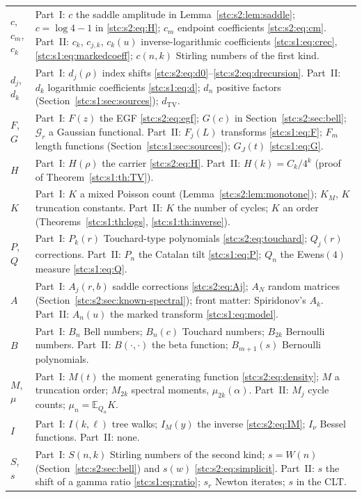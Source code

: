 \documentclass[11pt,letterpaper]{article}
\numberwithin{equation}{section}
\theoremstyle{remark}\newtheorem{remark}[theorem]{Remark}
\newcommand{\E}{\mathbb E}
\begin{document}
\begin{longtable}{@{}>{\raggedright\arraybackslash}p{} >{\raggedright\arraybackslash}p{}@{}}
$c$, $c_m$, $c_k$ & Part~I: $c$ the saddle amplitude in Lemma~\ref{stc:s2:lem:saddle}; $c=\log4-1$ in \eqref{stc:s2:eq:H}; $c_m$ endpoint coefficients \eqref{stc:s2:eq:cm}. Part~II: $c_k$, $c_{j,k}$, $c_k(u)$ inverse-logarithmic coefficients \eqref{stc:s1:eq:crec}, \eqref{stc:s1:eq:markedcoeff}; $c(n,k)$ Stirling numbers of the first kind.\\
$d_j$, $d_k$ & Part~I: $d_j(\rho)$ index shifts \eqref{stc:s2:eq:d0}--\eqref{stc:s2:eq:drecursion}. Part~II: $d_k$ logarithmic coefficients \eqref{stc:s1:eq:d}; $d_n$ positive factors (Section~\ref{stc:s1:sec:sources}); $d_{\mathrm{TV}}$.\\
$F$, $G$ & Part~I: $F(z)$ the EGF \eqref{stc:s2:eq:egf}; $G(c)$ in Section~\ref{stc:s2:sec:bell}; $\mathcal G_r$ a Gaussian functional. Part~II: $F_j(L)$ transforms \eqref{stc:s1:eq:F}; $F_m$ length functions (Section~\ref{stc:s1:sec:sources}); $G_J(t)$ \eqref{stc:s1:eq:G}.\\
$H$ & Part~I: $H(\rho)$ the carrier \eqref{stc:s2:eq:H}. Part~II: $H(k)=C_k/4^k$ (proof of Theorem~\ref{stc:s1:th:TV}).\\
$K$ & Part~I: $K$ a mixed Poisson count (Lemma~\ref{stc:s2:lem:monotone}); $K_M$, $K$ truncation constants. Part~II: $K$ the number of cycles; $K$ an order (Theorems~\ref{stc:s1:th:logs}, \ref{stc:s1:th:inverse}).\\
$P$, $Q$ & Part~I: $P_k(r)$ Touchard-type polynomials \eqref{stc:s2:eq:touchard}; $Q_j(r)$ corrections. Part~II: $P_n$ the Catalan tilt \eqref{stc:s1:eq:P}; $Q_n$ the Ewens$(4)$ measure \eqref{stc:s1:eq:Q}.\\
$A$ & Part~I: $A_j(r,b)$ saddle corrections \eqref{stc:s2:eq:Aj}; $A_N$ random matrices (Section~\ref{stc:s2:sec:known-spectral}); front matter: Spiridonov's $A_k$. Part~II: $A_n(u)$ the marked transform \eqref{stc:s1:eq:model}.\\
$B$ & Part~I: $B_n$ Bell numbers; $B_n(c)$ Touchard numbers; $B_{2k}$ Bernoulli numbers. Part~II: $B(\cdot,\cdot)$ the beta function; $B_{m+1}(s)$ Bernoulli polynomials.\\
$M$, $\mu$ & Part~I: $M(t)$ the moment generating function \eqref{stc:s2:eq:density}; $M$ a truncation order; $M_{2k}$ spectral moments, $\mu_{2k}(\alpha)$. Part~II: $M_j$ cycle counts; $\mu_n=\E_{Q_n}K$.\\
$I$ & Part~I: $I(k,\ell)$ tree walks; $I_M(y)$ the inverse \eqref{stc:s2:eq:IM}; $I_\nu$ Bessel functions. Part~II: none.\\
$S$, $s$ & Part~I: $S(n,k)$ Stirling numbers of the second kind; $s=W(n)$ (Section~\ref{stc:s2:sec:bell}) and $s(w)$ \eqref{stc:s2:eq:simplicit}. Part~II: $s$ the shift of a gamma ratio \eqref{stc:s1:eq:ratio}; $s_r$ Newton iterates; $s$ in the CLT.\\

\end{longtable}
\end{document}

